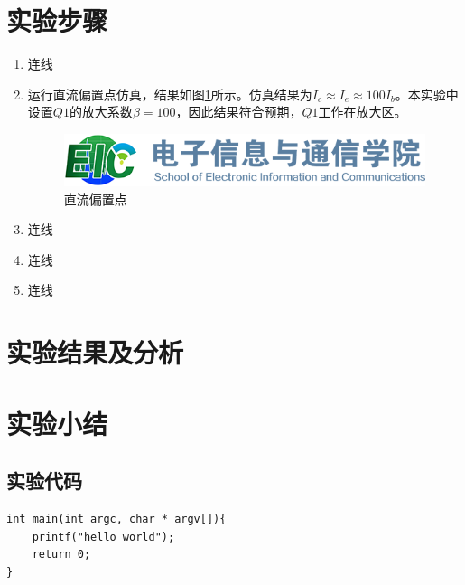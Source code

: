 \documentclass[12pt]{article}
\begin{document}
\section{实验步骤}

\begin{enumerate}
    \item 连线
    \item 运行直流偏置点仿真，结果如图\ref{fig:simdc}所示。仿真结果为$I_c \approx I_e \approx 100I_b$。本实验中设置$Q1$的放大系数$\beta=100$，因此结果符合预期，$Q1$工作在放大区。

\begin{figure}[htbp]
    \centering
    \includegraphics[scale=0.3]{figures/logo-hust-eic.png}
    \caption{直流偏置点}
    \label{fig:simdc}
\end{figure}

    \item 连线
    \item 连线
    \item 连线
\end{enumerate}


\section{实验结果及分析}

\section{实验小结}


\begin{appendices}

\section{实验代码}
\begin{verbatim}
int main(int argc, char * argv[]){
    printf("hello world");
    return 0;
}
\end{verbatim}

\end{appendices}
\end{document}
